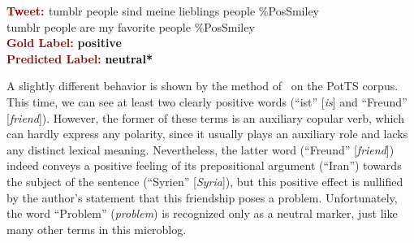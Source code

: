 \begin{example}\label{snt:cgsa:exmp:socher13-error}
  \noindent\textup{\bfseries\textcolor{darkred}{Tweet: }} {\upshape
    \colorbox{blue!1.4!white!5}{tumblr} \colorbox{white!19}{people} \colorbox{white!32}{sind} \colorbox{white!5}{meine} \colorbox{white!30}{lieblings} \colorbox{white!19}{people} \colorbox{white!8}{\%PosSmiley}}\\
  \noindent \colorbox{blue!1.4!white!5}{tumblr} \colorbox{white!19}{people} \colorbox{white!32}{are} \colorbox{white!5}{my} \colorbox{white!30}{favorite} \colorbox{white!19}{people} \colorbox{white!8}{\%PosSmiley}\\[\exampleSep]
  \noindent\textup{\bfseries\textcolor{darkred}{Gold Label:}}\hspace*{4.3em}\textbf{%
    \upshape\textcolor{green3}{positive}}\\
 \noindent\textup{\bfseries\textcolor{darkred}{Predicted Label:}}\hspace*{2em}\textbf{%
    \upshape\textcolor{black}{neutral*}}
\end{example}

A slightly different behavior is shown by the method
of~\citet{Severyn:15} on the PotTS corpus.  This time, we can see at
least two clearly positive words (``ist'' [\emph{is}] and ``Freund''
[\emph{friend}]).  However, the former of these terms is an auxiliary
copular verb, which can hardly express any polarity, since it usually
plays an auxiliary role and lacks any distinct lexical meaning.
Nevertheless, the latter word (``Freund'' [\emph{friend}]) indeed
conveys a positive feeling of its prepositional argument (``Iran'')
towards the subject of the sentence (``Syrien'' [\emph{Syria}]), but
this positive effect is nullified by the author's statement that this
friendship poses a problem. Unfortunately, the word ``Problem''
(\emph{problem}) is recognized only as a neutral marker, just like
many other terms in this microblog.

